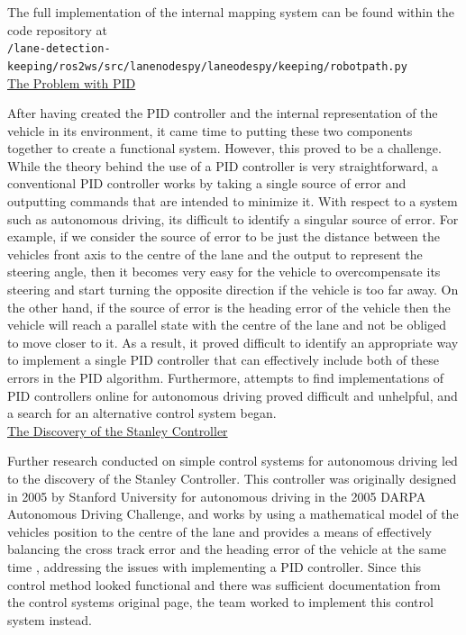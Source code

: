\documentclass[titlepage,draft]{article}
\begin{document}
{The full implementation of the internal mapping system can be found within the code repository at \\
\texttt{/lane-detection-keeping/ros2\textunderscore ws/src/lane\textunderscore nodes\textunderscore py/lane\textunderscore odes\textunderscore py/keeping/robot\textunderscore path.py}
\\

\underline{The Problem with PID}

After having created the PID controller and the internal representation of the vehicle in its environment, it came time to putting these two components together to create a functional system. However, this proved to be a challenge. While the theory behind the use of a PID controller is very straightforward, a conventional PID controller works by taking a single source of error and outputting commands that are intended to minimize it. With respect to a system such as autonomous driving, its difficult to identify a singular source of error. For example, if we consider the source of error to be just the distance between the vehicles front axis to the centre of the lane and the output to represent the steering angle, then it becomes very easy for the vehicle to overcompensate its steering and start turning the opposite direction if the vehicle is too far away. On the other hand, if the source of error is the heading error of the vehicle then the vehicle will reach a parallel state with the centre of the lane and not be obliged to move closer to it. As a result, it proved difficult to identify an appropriate way to implement a single PID controller that can effectively include both of these errors in the PID algorithm. Furthermore, attempts to find implementations of PID controllers online for autonomous driving proved difficult and unhelpful, and a search for an alternative control system began.
\\

\underline{The Discovery of the Stanley Controller}

Further research conducted on simple control systems for autonomous driving led to the discovery of the Stanley Controller. This controller was originally designed in 2005 by Stanford University for autonomous driving in the 2005 DARPA Autonomous Driving Challenge, and works by using a mathematical model of the vehicles position to the centre of the lane and provides a means of effectively balancing the cross track error and the heading error of the vehicle at the same time \cite{4282788}, addressing the issues with implementing a PID controller. Since this control method looked functional and there was sufficient documentation from the control systems original page, the team worked to implement this control system instead.
\\

}
\end{document}
